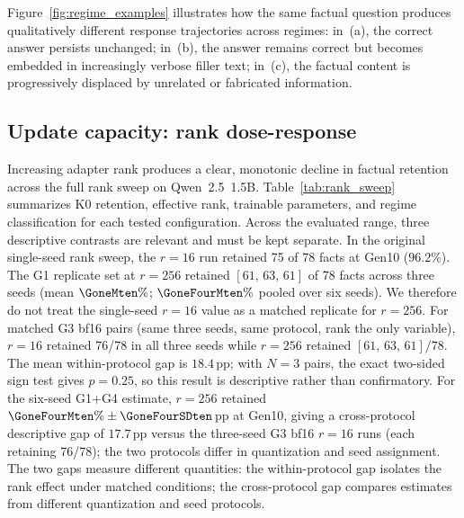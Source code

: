 \documentclass[a4paper,fleqn]{cas-dc}
\newif\ifshowchanges
\newcommand{\rev}[1]{\ifshowchanges{\color{blue}#1}\else{#1}\fi}
\begin{document}
Figure~\ref{fig:regime_examples} illustrates how the same factual question
produces qualitatively different response trajectories across regimes: in~(a),
the correct answer persists unchanged; in~(b), the answer remains correct but
becomes embedded in increasingly verbose filler text; in~(c), the factual
content is progressively displaced by unrelated or fabricated information.

\subsection{Update capacity: rank dose-response}\label{sec:res_capacity}

Increasing adapter rank produces a clear, monotonic decline in factual retention
across the full rank sweep on Qwen~2.5~1.5B.
Table~\ref{tab:rank_sweep} summarizes K0 retention, effective rank, trainable
parameters, and regime classification for each tested configuration. Across the evaluated range, three descriptive contrasts are relevant and must be kept separate.
\rev{In the original single-seed rank sweep, the $r=16$ run retained 75 of 78
facts at Gen10 ($96.2\%$). The G1 replicate set at $r=256$ retained
$[61,\,63,\,61]$ of 78 facts across three seeds (mean $\rev{\GoneMten\%}$; $\rev{\GoneFourMten\%}$ pooled over six seeds). We therefore do not treat the single-seed $r=16$ value as a matched
replicate for $r=256$.}
\rev{For matched G3 bf16 pairs (same three seeds, same protocol, rank the only
variable), $r=16$ retained 76/78 in all three seeds while $r=256$ retained
$[61,\,63,\,61]/78$. The mean within-protocol gap is $18.4$\,pp; with $N{=}3$
pairs, the exact two-sided sign test gives $p{=}0.25$, so this result is
descriptive rather than confirmatory.}
\rev{For the six-seed G1$+$G4 estimate, $r=256$ retained
$\GoneFourMten\%\pm\GoneFourSDten$\,pp at Gen10, giving a cross-protocol
descriptive gap of $17.7$\,pp versus the three-seed G3 bf16 $r=16$ runs (each retaining 76/78); the two
protocols differ in quantization and seed assignment. \rev{The two gaps measure different quantities: the within-protocol gap isolates the rank effect under matched conditions; the cross-protocol gap compares estimates from different quantization and seed protocols.}}
\end{document}
